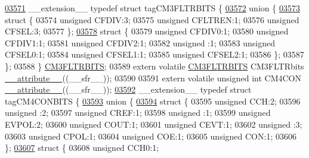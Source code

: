 \begin{DoxyCode}
\hypertarget{a00015_source_l03571}{}\hyperlink{a00015}{03571} \_\_extension\_\_ \textcolor{keyword}{typedef} \textcolor{keyword}{struct }tagCM3FLTRBITS \{
\hypertarget{a00015_source_l03572}{}\hyperlink{a00015}{03572}   \textcolor{keyword}{union }\{
\hypertarget{a00015_source_l03573}{}\hyperlink{a00015}{03573}     \textcolor{keyword}{struct }\{
03574       \textcolor{keywordtype}{unsigned} CFDIV:3;
03575       \textcolor{keywordtype}{unsigned} CFLTREN:1;
03576       \textcolor{keywordtype}{unsigned} CFSEL:3;
03577     \};
\hypertarget{a00015_source_l03578}{}\hyperlink{a00015}{03578}     \textcolor{keyword}{struct }\{
03579       \textcolor{keywordtype}{unsigned} CFDIV0:1;
03580       \textcolor{keywordtype}{unsigned} CFDIV1:1;
03581       \textcolor{keywordtype}{unsigned} CFDIV2:1;
03582       \textcolor{keywordtype}{unsigned} :1;
03583       \textcolor{keywordtype}{unsigned} CFSEL0:1;
03584       \textcolor{keywordtype}{unsigned} CFSEL1:1;
03585       \textcolor{keywordtype}{unsigned} CFSEL2:1;
03586     \};
03587   \};
03588 \} \hyperlink{a00015_d4/db5/a00328}{CM3FLTRBITS};
03589 \textcolor{keyword}{extern} \textcolor{keyword}{volatile} \hyperlink{a00015_d4/db5/a00328}{CM3FLTRBITS} CM3FLTRbits \hyperlink{a00015_a493c46f03454991ccc5aa7a6e1dfb2a7}{\_\_attribute\_\_}((\_\_sfr\_\_));
03590 
03591 \textcolor{keyword}{extern} \textcolor{keyword}{volatile} \textcolor{keywordtype}{unsigned} \textcolor{keywordtype}{int}  CM4CON \hyperlink{a00015_a493c46f03454991ccc5aa7a6e1dfb2a7}{\_\_attribute\_\_}((\_\_sfr\_\_));
\hypertarget{a00015_source_l03592}{}\hyperlink{a00014}{03592} \_\_extension\_\_ \textcolor{keyword}{typedef} \textcolor{keyword}{struct }tagCM4CONBITS \{
\hypertarget{a00015_source_l03593}{}\hyperlink{a00015}{03593}   \textcolor{keyword}{union }\{
\hypertarget{a00015_source_l03594}{}\hyperlink{a00015}{03594}     \textcolor{keyword}{struct }\{
03595       \textcolor{keywordtype}{unsigned} CCH:2;
03596       \textcolor{keywordtype}{unsigned} :2;
03597       \textcolor{keywordtype}{unsigned} CREF:1;
03598       \textcolor{keywordtype}{unsigned} :1;
03599       \textcolor{keywordtype}{unsigned} EVPOL:2;
03600       \textcolor{keywordtype}{unsigned} COUT:1;
03601       \textcolor{keywordtype}{unsigned} CEVT:1;
03602       \textcolor{keywordtype}{unsigned} :3;
03603       \textcolor{keywordtype}{unsigned} CPOL:1;
03604       \textcolor{keywordtype}{unsigned} COE:1;
03605       \textcolor{keywordtype}{unsigned} CON:1;
03606     \};
\hypertarget{a00015_source_l03607}{}\hyperlink{a00015}{03607}     \textcolor{keyword}{struct }\{
03608       \textcolor{keywordtype}{unsigned} CCH0:1;

\end{DoxyCode}
